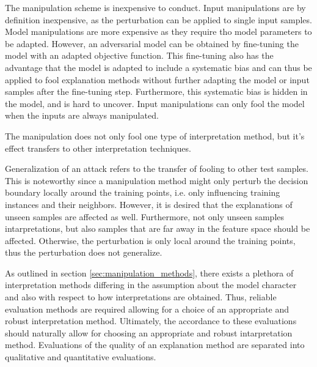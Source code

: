  The manipulation scheme is inexpensive to conduct. Input manipulations are by definition inexpensive, as the perturbation can be applied to single input samples. Model manipulations are more expensive as they require tho model parameters to be adapted. However, an adversarial model can be obtained by fine-tuning the model with an adapted objective function. This fine-tuning also has the advantage that the model is adapted to include a systematic bias and can thus be applied to fool explanation methods without further adapting the model or input samples after the fine-tuning step. Furthermore, this systematic bias is hidden in the model, and is hard to uncover. Input manipulations can only fool the model when the inputs are always manipulated. 

 The manipulation does not only fool one type of interpretation method, but it's effect transfers to other interpretation techniques. 


 Generalization of an attack refers to the transfer of fooling to other test samples. This is noteworthy since a manipulation method might only perturb the decision boundary locally around the training points, i.e. only influencing training instances and their neighbors. However, it is desired that the explanations of unseen samples are affected as well. Furthermore, not only unseen samples intarpretations, but also samples that are far away in the feature space should be affected. 
Otherwise, the perturbation is only local around the training points, thus the perturbation does not generalize. 

\par\smallskip
As outlined in section \autoref{sec:manipulation_methods}, there exists a plethora of interpretation methods differing in the assumption about the model character and also with respect to how interpretations are obtained. Thus, reliable evaluation methods are required allowing for a choice of an appropriate and robust interpretation method. Ultimately, the accordance to these evaluations should naturally allow for choosing an appropriate and robust intarpretation method.  
Evaluations of the quality of an explanation method are separated into qualitative and quantitative evaluations. 

